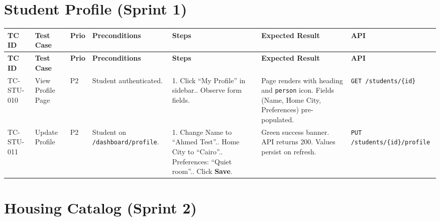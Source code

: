 \documentclass[12pt,a4paper]{article}
\begin{document}
\section{Student Profile (Sprint 1)}

\begin{longtable}{L{2cm} L{3cm} L{1cm} L{4cm} L{5.5cm} L{5.5cm} L{3cm}}
\toprule
\textbf{TC ID} & \textbf{Test Case} & \textbf{Prio} & \textbf{Preconditions} & \textbf{Steps} & \textbf{Expected Result} & \textbf{API} \\
\midrule
\endfirsthead
\toprule
\textbf{TC ID} & \textbf{Test Case} & \textbf{Prio} & \textbf{Preconditions} & \textbf{Steps} & \textbf{Expected Result} & \textbf{API} \\
\midrule
\endhead
\bottomrule
\endfoot

TC-STU-010
& View Profile Page
& P2
& Student authenticated.
& 1. Click ``My Profile'' in sidebar.. Observe form fields.
& Page renders with heading and \texttt{person} icon. Fields (Name, Home City, Preferences) pre-populated.
& \texttt{GET /students/\{id\}}
\\
\midrule

TC-STU-011
& Update Profile
& P2
& Student on \texttt{/dashboard/profile}.
& 1. Change Name to ``Ahmed Test''.. Home City to ``Cairo''.. Preferences: ``Quiet room''.. Click \textbf{Save}.
& Green success banner. API returns 200. Values persist on refresh.
& \texttt{PUT /students/\{id\}/profile}
\\

\end{longtable}


\section{Housing Catalog (Sprint 2)}
\end{document}
